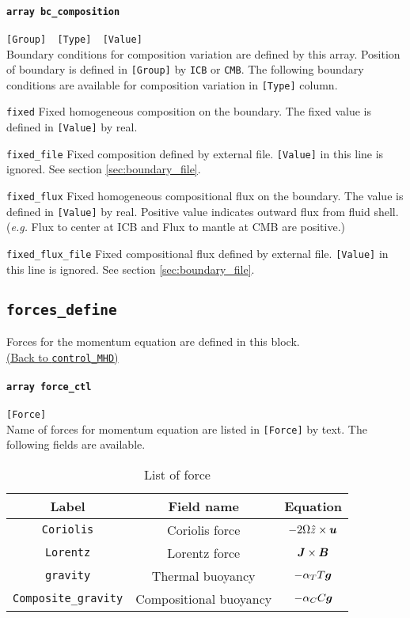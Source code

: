 \paragraph{\tt array bc\_composition}
\label{href_t:bc_composition}
\verb|[Group]  [Type]  [Value]| \\
Boundary conditions for composition variation are defined by this array. Position of boundary is defined in \verb|[Group]| by {\tt ICB} or {\tt CMB}. The following boundary conditions are available for composition variation in \verb|[Type]| column.
%
\begin{description}
\item{\tt fixed}			Fixed homogeneous composition on the boundary. The fixed value is defined in \verb|[Value]| by real.
\item{\tt fixed\_file}			Fixed composition defined by external file. \verb|[Value]| in this line is ignored. See section \ref{sec:boundary_file}.
\item{\tt fixed\_flux}	Fixed homogeneous compositional flux on the boundary. The value is defined in \verb|[Value]| by real. Positive value indicates outward flux from fluid shell. ({\it e.g.} Flux to center at ICB and Flux to mantle at CMB are positive.)
\item{\tt fixed\_flux\_file}			Fixed compositional flux defined by external file. \verb|[Value]| in this line is ignored. See section \ref{sec:boundary_file}.
\end{description}
%

\subsection{\tt forces\_define}
\label{href_t:forces_define}
Forces for the momentum equation are defined in this block. \\
\hyperref[href_i:forces_define]{(Back to {\tt control\_MHD})}

\paragraph{\tt array force\_ctl}
\label{href_t:force_ctl}
\verb|[Force]| \\
Name of forces for momentum equation are listed in \verb|[Force]| by text.
The following fields are available.
%
\begin{table}[htdp]
\caption{List of force}
\begin{center}
\begin{tabular}{|c|c|c|}
\hline
 Label & Field name & Equation \\ \hline
\verb|Coriolis| & Coriolis force & $-2\Omega \hat{z} \times \mbox{\boldmath$u$} $ \\
\verb|Lorentz| & Lorentz force &  $\mbox{\boldmath$J$} \times \mbox{\boldmath$B$} $ \\
\verb|gravity| & Thermal buoyancy & $-\alpha_{T} T \mbox{\boldmath$g$}$ \\
\verb|Composite_gravity| & Compositional buoyancy  & $-\alpha_{C} C \mbox{\boldmath$g$}$\\ \hline
\end{tabular}
\end{center}
\label{table:forces}
\end{table}
%

